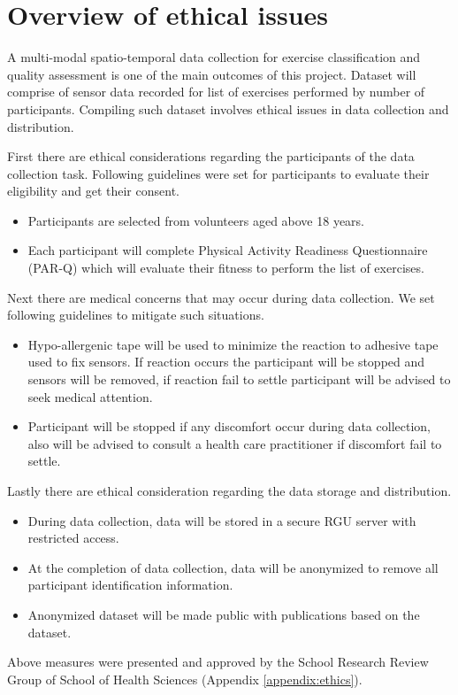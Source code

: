 \section{Overview of ethical issues}
A multi-modal spatio-temporal data collection for exercise classification and quality assessment is one of the main outcomes of this project. Dataset will comprise of sensor data recorded for list of exercises performed by number of participants. Compiling such dataset involves ethical issues in data collection and distribution.

First there are ethical considerations regarding the participants of the data collection task. Following guidelines were set for participants to evaluate their eligibility and get their consent.
\begin{itemize}
\item Participants are selected from volunteers aged above 18 years. 
\item Each participant will complete Physical Activity Readiness Questionnaire (PAR-Q) which will evaluate their fitness to perform the list of exercises. 
\end{itemize}
Next there are medical concerns that may occur during data collection. We set following guidelines to mitigate such situations.
\begin{itemize}
\item Hypo-allergenic tape will be used to minimize the reaction to adhesive tape used to fix sensors. If reaction occurs the participant will be stopped and sensors will be removed, if reaction fail to settle participant will be advised to seek medical attention. 
\item Participant will be stopped if any discomfort occur during data collection, also will be advised to consult a health care practitioner if discomfort fail to settle. 
\end{itemize}
Lastly there are ethical consideration regarding the data storage and distribution. 
\begin{itemize}
\item During data collection, data will be stored in a secure RGU server with restricted access.
\item At the completion of data collection, data will be anonymized to remove all participant identification information.
\item Anonymized dataset will be made public with publications based on the dataset. 
\end{itemize}
Above measures were presented and approved by the School Research Review Group of School of Health Sciences (Appendix \ref{appendix:ethics}).